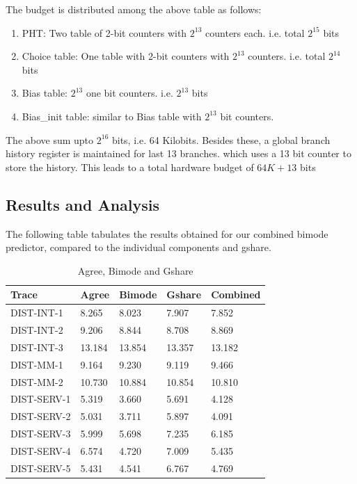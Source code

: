 \documentclass{sig-alternate}
\begin{document}
The budget is distributed among the above table as follows:
\begin{enumerate}
    \item PHT: Two table of 2-bit counters with $2^{13}$ counters each. i.e. total $2^{15}$ bits
    \item Choice table: One table with 2-bit counters with $2^{13}$ counters. i.e. total $2^{14}$ bits
    \item Bias table: $2^{13}$ one bit counters. i.e. $2^{13}$ bits
    \item Bias\_init table: similar to Bias table with $2^{13}$ bit counters.
\end{enumerate}

The above sum upto $2^{16}$ bits, i.e. 64 Kilobits. Besides these, a global branch history register is maintained for last 13 branches. which uses a 13 bit counter to store the history. This leads to a total hardware budget of $64K + 13$ bits\par

\subsection{Results and Analysis}

The following table tabulates the results obtained for our combined bimode predictor, compared to the individual components and gshare.

\begin{table}[h]

\caption{Agree\cite{agreepaper}, Bimode\cite{bimodepaper} and Gshare\cite{gsharepaper}}
\centering
\begin{tabular}{lllll}
\hline
Trace & Agree & Bimode & Gshare & Combined \\
\hline
DIST-INT-1 & 8.265 & 8.023 & 7.907 & 7.852 \\
DIST-INT-2 & 9.206 & 8.844 & 8.708 & 8.869 \\
DIST-INT-3 & 13.184 & 13.854 & 13.357 & 13.182 \\
DIST-MM-1 & 9.164 & 9.230 & 9.119 & 9.466 \\
DIST-MM-2 & 10.730 & 10.884 & 10.854 & 10.810 \\
DIST-SERV-1 & 5.319 & 3.660 & 5.691 & 4.128 \\
DIST-SERV-2 & 5.031 & 3.711 & 5.897 & 4.091 \\
DIST-SERV-3 & 5.999 & 5.698 & 7.235 & 6.185 \\
DIST-SERV-4 & 6.574 & 4.720 & 7.009 & 5.435 \\
DIST-SERV-5 & 5.431 & 4.541 & 6.767 & 4.769 \\
\hline
\end{tabular}
\end{table}
\end{document}
